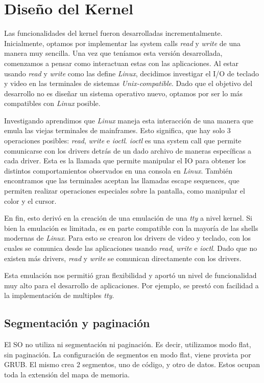 \documentclass[a4paper,10pt]{article}
\begin{document}
\section{Diseño del Kernel}
    Las funcionalidades del kernel fueron desarrolladas incrementalmente.
    Inicialmente, optamos por implementar las system calls \textit{read} y \textit{write} de una manera muy sencilla.
    Una vez que teníamos esta versión desarrollada, comenzamos a pensar como interactuan estas con las aplicaciones.
    Al estar usando \textit{read} y \textit{write} como las define \textit{Linux}, decidimos investigar el I/O de teclado y video en las terminales de sistemas \textit{Unix-compatible}.
    Dado que el objetivo del desarrollo no es diseñar un sistema operativo nuevo, optamos por ser lo más compatibles con \textit{Linux} posible.

    Investigando aprendimos que \textit{Linux} maneja esta interacción de una manera que emula las viejas terminales de mainframes.
    Esto significa, que hay solo 3 operaciones posibles: \textit{read}, \textit{write} e \textit{ioctl}.
    \textit{ioctl} es una system call que permite comunicarse con los drivers detrás de un dado archivo de maneras específicas a cada driver.
    Esta es la llamada que permite manipular el IO para obtener los distintos comportamientos observados en una consola en \textit{Linux}.
    También encontramos que las terminales aceptan las llamadas escape sequences, que permiten realizar operaciones especiales sobre la pantalla, como manipular el color y el cursor.

    En fin, esto derivó en la creación de una emulación de una \textit{tty} a nivel kernel.
    Si bien la emulación es limitada, es en parte compatible con la mayoría de las shells modernas de \textit{Linux}.
    Para esto se crearon los drivers de video y teclado, con los cuales se comunica desde las aplicaciones usando \textit{read}, \textit{write} e \textit{ioctl}.
    Dado que no existen más drivers, \textit{read} y \textit{write} se comunican directamente con los drivers.

    Esta emulación nos permitió gran flexibilidad y aportó un nivel de funcionalidad muy alto para el desarrollo de aplicaciones.
    Por ejemplo, se prestó con facilidad a la implementación de multiples \textit{tty}.

    \subsection{Segmentación y paginación}
        El SO no utiliza ni segmentación ni paginación. 
        Es decir, utilizamos modo flat, sin paginación.
        La configuración de segmentos en modo flat, viene provista por GRUB.
        El mismo crea 2 segmentos, uno de código, y otro de datos.
        Estos ocupan toda la extensión del mapa de memoria.
\end{document}
